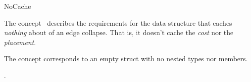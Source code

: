 
\begin{ccRefConcept}{NoCache}


\ccDefinition

The concept \ccRefName\ describes the requirements for the data structure that caches {\em nothing} about of an edge collapse. That is, it doesn't cache the {\em cost} nor the {\em placement}.

The concept corresponds to an empty struct with no nested types nor members.

\ccRefines
{}

\ccHasModels

.

\end{ccRefConcept}

